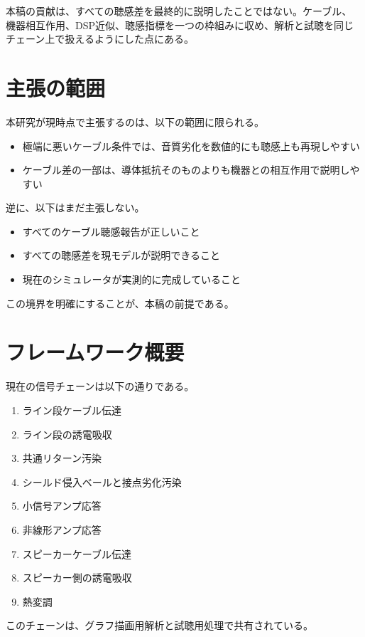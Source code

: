 \documentclass[a4paper,11pt]{ltjsarticle}
\begin{document}
本稿の貢献は、すべての聴感差を最終的に説明したことではない。ケーブル、
機器相互作用、DSP近似、聴感指標を一つの枠組みに収め、解析と試聴を同じ
チェーン上で扱えるようにした点にある。

\section{主張の範囲}

本研究が現時点で主張するのは、以下の範囲に限られる。

\begin{itemize}
  \item 極端に悪いケーブル条件では、音質劣化を数値的にも聴感上も再現しやすい
  \item ケーブル差の一部は、導体抵抗そのものよりも機器との相互作用で説明しやすい
\end{itemize}

逆に、以下はまだ主張しない。

\begin{itemize}
  \item すべてのケーブル聴感報告が正しいこと
  \item すべての聴感差を現モデルが説明できること
  \item 現在のシミュレータが実測的に完成していること
\end{itemize}

この境界を明確にすることが、本稿の前提である。

\section{フレームワーク概要}

現在の信号チェーンは以下の通りである。

\begin{enumerate}
  \item ライン段ケーブル伝達
  \item ライン段の誘電吸収
  \item 共通リターン汚染
  \item シールド侵入ベールと接点劣化汚染
  \item 小信号アンプ応答
  \item 非線形アンプ応答
  \item スピーカーケーブル伝達
  \item スピーカー側の誘電吸収
  \item 熱変調
\end{enumerate}

このチェーンは、グラフ描画用解析と試聴用処理で共有されている。
\end{document}
